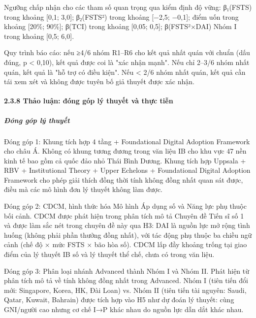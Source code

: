 \documentclass[12pt,a4paper]{article}
\begin{document}
Ngưỡng chấp nhận cho các tham số quan trọng qua kiểm định độ vững:
β₁(FSTS) trong khoảng {[}0,1; 3,0{]}; β₂(FSTS²) trong khoảng {[}−2,5;
−0,1{]}; điểm uốn trong khoảng {[}20\%; 90\%{]}; β(TCI) trong khoảng
{[}0,05; 0,5{]}; β(FSTS²×DAI) Nhóm I trong khoảng {[}0,5; 6,0{]}.

Quy trình báo cáo: nếu ≥4/6 nhóm R1--R6 cho kết quả nhất quán với chuẩn
(dấu đúng, p \textless{} 0,10), kết quả được coi là "xác nhận mạnh". Nếu
chỉ 2--3/6 nhóm nhất quán, kết quả là "hỗ trợ có điều kiện". Nếu
\textless{} 2/6 nhóm nhất quán, kết quả cần tái xem xét và không được
tuyên bố giả thuyết được xác nhận.

\hypertarget{238-thux1ea3o-luux1eadn-ux111uxf3ng-guxf3p-luxfd-thuyux1ebft-vuxe0-thux1ef1c-tiux1ec5n}{%
\paragraph{2.3.8 Thảo luận: đóng góp lý thuyết và thực
tiễn}\label{238-thux1ea3o-luux1eadn-ux111uxf3ng-guxf3p-luxfd-thuyux1ebft-vuxe0-thux1ef1c-tiux1ec5n}}

\hypertarget{ux111uxf3ng-guxf3p-luxfd-thuyux1ebft}{%
\subparagraph{Đóng góp lý
thuyết}\label{ux111uxf3ng-guxf3p-luxfd-thuyux1ebft}}

Đóng góp 1: Khung tích hợp 4 tầng + Foundational Digital Adoption
Framework cho châu Á. Không có khung tương đương trong văn liệu IB cho
khu vực 47 nền kinh tế bao gồm cả quốc đảo nhỏ Thái Bình Dương. Khung
tích hợp Uppsala + RBV + Institutional Theory + Upper Echelons +
Foundational Digital Adoption Framework cho phép giải thích đồng thời
tính không đồng nhất quan sát được, điều mà các mô hình đơn lý thuyết
không làm được.

Đóng góp 2: CDCM, hình thức hóa Mô hình Áp dụng số và Năng lực phụ thuộc
bối cảnh. CDCM được phát hiện trong phân tích mô tả Chuyên đề Tiến sĩ số
1 và được làm sắc nét trong chuyên đề này qua H3: DAI là nguồn lực mở
rộng tình huống (không phải phần thưởng đồng nhất), với tác động phụ
thuộc ba chiều ngữ cảnh (chế độ × mức FSTS × bão hòa số). CDCM lấp đầy
khoảng trống tại giao điểm của lý thuyết IB số và lý thuyết thể chế,
chưa có trong văn liệu.

Đóng góp 3: Phân loại nhánh Advanced thành Nhóm I và Nhóm II. Phát hiện
từ phân tích mô tả về tính không đồng nhất trong Advanced. Nhóm I (tiên
tiến đổi mới: Singapore, Korea, HK, Đài Loan) vs. Nhóm II (tiên tiến tài
nguyên: Saudi, Qatar, Kuwait, Bahrain) được tích hợp vào H5 như dự đoán
lý thuyết: cùng GNI/người cao nhưng cơ chế I→P khác nhau do nguồn lực
dẫn dắt khác nhau.
\end{document}
